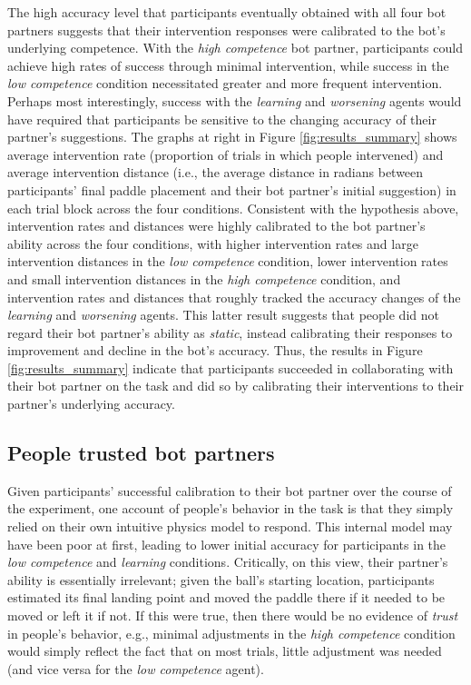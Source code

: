 \documentclass[10pt,letterpaper]{article}
\begin{document}
The high accuracy level that participants eventually obtained with all four bot partners suggests that their intervention responses were calibrated to the bot's underlying competence. With the \textit{high competence} bot partner, participants could achieve high rates of success through minimal intervention, while success in the \textit{low competence} condition necessitated greater and more frequent intervention. Perhaps most interestingly, success with the \textit{learning} and \textit{worsening} agents would have required that participants be sensitive to the changing accuracy of their partner's suggestions. The graphs at right in Figure \ref{fig:results_summary} shows average intervention rate (proportion of trials in which people intervened) and average intervention distance (i.e., the average distance in radians between participants' final paddle placement and their bot partner's initial suggestion) in each trial block across the four conditions. Consistent with the hypothesis above, intervention rates and distances were highly calibrated to the bot partner's ability across the four conditions, with higher intervention rates and large intervention distances in the \textit{low competence} condition, lower intervention rates and small intervention distances in the \textit{high competence} condition, and intervention rates and distances that roughly tracked the accuracy changes of the \textit{learning} and \textit{worsening} agents. This latter result suggests that people did not regard their bot partner's ability as \textit{static}, instead calibrating their responses to improvement and decline in the bot's accuracy. Thus, the results in Figure \ref{fig:results_summary} indicate that participants succeeded in collaborating with their bot partner on the task and did so by calibrating their interventions to their partner's underlying accuracy.
 

\subsection{People trusted bot partners}

Given participants' successful calibration to their bot partner over the course of the experiment, one account of people's behavior in the task is that they simply relied on their own intuitive physics model to respond. This internal model may have been poor at first, leading to lower initial accuracy for participants in the \textit{low competence} and \textit{learning} conditions. Critically, on this view, their partner's ability is essentially irrelevant; given the ball's starting location, participants estimated its final landing point and moved the paddle there if it needed to be moved or left it if not. If this were true, then there would be no evidence of \textit{trust} in people's behavior, e.g., minimal adjustments in the \textit{high competence} condition would simply reflect the fact that on most trials, little adjustment was needed (and vice versa for the \textit{low competence} agent). 
\end{document}
